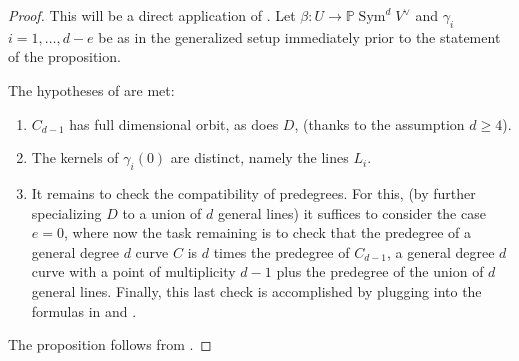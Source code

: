 \documentclass[12 pt, reqno]{amsart}
\newtheorem{prop}[thm]{Proposition}
\theoremstyle{definition}
\newcommand{\on}{\operatorname}
\newcommand{\mb}{\mathbb}
\renewcommand{\P}{\mb{P}}
\begin{document}
\begin{proof}
  This will be a direct application of .  Let
  $\beta: U \to \P \on{Sym}^{d}V^{\vee}$ and $\gamma_{i}$
  $i=1, \dots, d-e$ be as in the generalized setup immediately prior
  to the statement of the proposition.

  The hypotheses of  are met:

\begin{enumerate}
\item $C_{d-1}$ has full dimensional orbit, as does $D$, (thanks to
  the assumption $d \geq 4$).
\item The kernels of $\gamma_{i}(0)$ are
  distinct, namely the lines $L_{i}$.

\item It remains to check the compatibility of predegrees.  For this,
  (by further specializing $D$ to a union of $d$ general lines) it
  suffices to consider the case $e=0$, where now the task remaining is
  to check that the predegree of a general degree $d$ curve $C$ is $d$
  times the predegree of $C_{d-1}$, a general degree $d$ curve with a
  point of multiplicity $d-1$ plus the predegree of the union of $d$
  general lines. Finally, this last check is accomplished by plugging
  into the formulas in \cite[Examples 3.1, 4.2]{AF00} and \cite{AF93}.
\end{enumerate}
The proposition follows from .
\end{proof}

\end{document}
